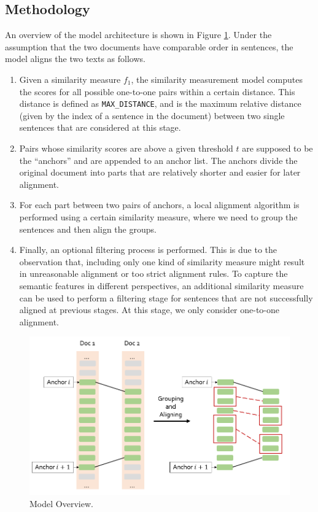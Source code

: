 \documentclass[runningheads]{llncs}
\begin{document}
\begin{spacing}{1.1}


\section{Methodology}
\label{sec:method}

An overview of the model architecture is shown in Figure \ref{fig:4}. Under the assumption that the two documents have comparable order in sentences, the model aligns the two texts as follows.
\begin{enumerate}
	\item Given a similarity measure $f_1$, the similarity measurement model computes the scores for all possible one-to-one pairs within a certain distance. This distance is defined as \texttt{MAX\_DISTANCE}, and is the maximum relative distance (given by the index of a sentence in the document) between two single sentences that are considered at this stage.
	\item Pairs whose similarity scores are above a given threshold $t$ are supposed to be the ``anchors'' and are appended to an anchor list. The anchors divide the original document into parts that are relatively shorter and easier for later alignment.
	\item For each part between two pairs of anchors, a local alignment algorithm is performed using a certain similarity measure, where we need to group the sentences and then align the groups.
	\item Finally, an optional filtering process is performed. This is due to the observation that, including only one kind of similarity measure might result in unreasonable alignment or too strict alignment rules. To capture the semantic features in different perspectives, an additional similarity measure can be used to perform a filtering stage for sentences that are not successfully aligned at previous stages. At this stage, we only consider one-to-one alignment.
\end{enumerate}

\begin{figure}[htbp]
	\centering
	\includegraphics[width=12cm]{./4.PNG}
	\caption{Model Overview.}\label{fig:4}
\end{figure}


\end{spacing}
\end{document}
